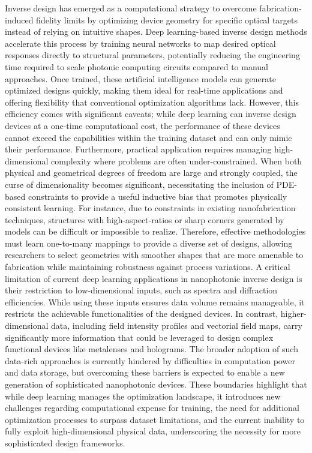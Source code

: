 \documentclass[11pt]{article}
\begin{document}
Inverse design has emerged as a computational strategy to overcome fabrication-induced fidelity limits by optimizing device geometry for specific optical targets instead of relying on intuitive shapes. \citep{doi_10_48550_arxiv_2506_21748_dc49c062} \citep{doi_10_1039_d4nr03081h_5c44e89e} Deep learning-based inverse design methods accelerate this process by training neural networks to map desired optical responses directly to structural parameters, potentially reducing the engineering time required to scale photonic computing circuits compared to manual approaches. \citep{doi_10_1117_12_3092203_3c6166cd} \citep{doi_10_1088_2040_8986_ae709e_8af9beda} Once trained, these artificial intelligence models can generate optimized designs quickly, making them ideal for real-time applications and offering flexibility that conventional optimization algorithms lack. However, this efficiency comes with significant caveats; while deep learning can inverse design devices at a one-time computational cost, the performance of these devices cannot exceed the capabilities within the training dataset and can only mimic their performance. Furthermore, practical application requires managing high-dimensional complexity where problems are often under-constrained. When both physical and geometrical degrees of freedom are large and strongly coupled, the curse of dimensionality becomes significant, necessitating the inclusion of PDE-based constraints to provide a useful inductive bias that promotes physically consistent learning. For instance, due to constraints in existing nanofabrication techniques, structures with high-aspect-ratios or sharp corners generated by models can be difficult or impossible to realize. Therefore, effective methodologies must learn one-to-many mappings to provide a diverse set of designs, allowing researchers to select geometries with smoother shapes that are more amenable to fabrication while maintaining robustness against process variations. A critical limitation of current deep learning applications in nanophotonic inverse design is their restriction to low-dimensional inputs, such as spectra and diffraction efficiencies. While using these inputs ensures data volume remains manageable, it restricts the achievable functionalities of the designed devices. In contrast, higher-dimensional data, including field intensity profiles and vectorial field maps, carry significantly more information that could be leveraged to design complex functional devices like metalenses and holograms. The broader adoption of such data-rich approaches is currently hindered by difficulties in computation power and data storage, but overcoming these barriers is expected to enable a new generation of sophisticated nanophotonic devices. These boundaries highlight that while deep learning manages the optimization landscape, it introduces new challenges regarding computational expense for training, the need for additional optimization processes to surpass dataset limitations, and the current inability to fully exploit high-dimensional physical data, underscoring the necessity for more sophisticated design frameworks. \citep{doi_10_1515_nanoph_2024_0536_4b6631ba} \citep{doi_10_29026_oes_2022_210012_27973a69} \citep{doi_10_1002_adom_202502062_d73a85e1} \citep{doi_10_1515_nanoph_2018_0183_d85e9193}
\end{document}
